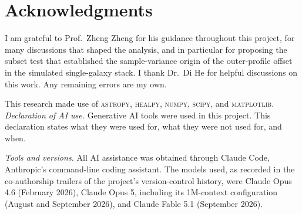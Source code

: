\documentclass[11pt,letterpaper]{article}
\begin{document}
\section*{Acknowledgments}
I am grateful to Prof.\ Zheng Zheng for his guidance throughout this
project, for many discussions that shaped the analysis, and in particular
for proposing the subset test that established the sample-variance origin
of the outer-profile offset in the simulated single-galaxy stack. I thank
Dr.\ Di He for helpful discussions on this work.
Any remaining errors are my own.




This research made use of \textsc{astropy}, \textsc{healpy}, \textsc{numpy},
\textsc{scipy}, and \textsc{matplotlib}. %
\emph{Declaration of AI use.} Generative AI tools were used in this project.
This declaration states what they were used for, what they were not used for,
and when.

\emph{Tools and versions.} All AI assistance was obtained through Claude Code,
Anthropic's command-line coding assistant. The models used, as recorded in the
co-authorship trailers of the project's version-control history, were Claude
Opus 4.6 (February 2026), Claude Opus 5, including its 1M-context configuration
(August and September 2026), and Claude Fable 5.1 (September 2026).
\end{document}
